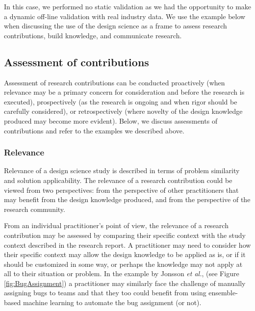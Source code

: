 \documentclass[graybox]{svmult}
\begin{document}
In this case, we performed no static validation as we had the opportunity to make a dynamic off-line validation with real industry data. We use the example below when discussing the use of the design science as a frame to assess research contributions, build knowledge, and communicate research.



\subsection{Assessment of contributions}
\label{sec:assessment}

Assessment of research contributions can be conducted proactively (when relevance may be a primary concern for consideration and before the research is executed), prospectively (as the research is ongoing and when rigor should be carefully considered), or retrospectively (where novelty of the design knowledge produced may become more evident).
Below, we discuss assessments of contributions and refer to the examples we described above.




\subsubsection{Relevance %
} 

Relevance of a design science study is described in terms of problem similarity and solution applicability. The relevance of a research contribution could be viewed from two perspectives: from the perspective of other practitioners that may benefit from the design knowledge produced, and from the perspective of the research community. 

From an individual practitioner's point of view, the relevance of a research contribution may be assessed by comparing their specific context with the study context described in the research report. 
A practitioner may need to consider how their specific context may allow the design knowledge to be applied as is, or if it should be customized in some way, or perhaps the knowledge may not apply at all to their situation or problem.
In the example by Jonsson \emph{et al.}, (see Figure \ref{fig:BugAssignment}) a practitioner may  similarly face the challenge of manually assigning bugs to teams and  that they too could benefit from using ensemble-based machine learning to automate the bug assignment (or not).
\end{document}

